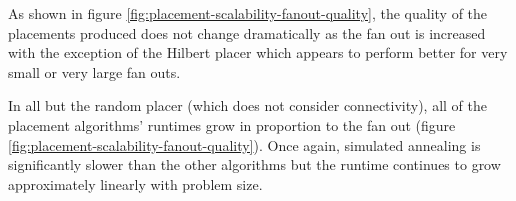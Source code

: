 				As shown in figure \ref{fig:placement-scalability-fanout-quality}, the
				quality of the placements produced does not change dramatically as the
				fan out is increased with the exception of the Hilbert placer which
				appears to perform better for very small or very large fan outs.
				
				In all but the random placer (which does not consider connectivity),
				all of the placement algorithms' runtimes grow in proportion to the fan
				out (figure \ref{fig:placement-scalability-fanout-quality}). Once
				again, simulated annealing is significantly slower than the other
				algorithms but the runtime continues to grow approximately linearly
				with problem size.
